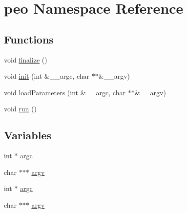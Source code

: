 \hypertarget{namespacepeo}{
\section{peo Namespace Reference}
\label{namespacepeo}
}


\subsection*{Functions}
\begin{CompactItemize}
\item 
\hypertarget{namespacepeo_f90478489cc92d1e6abb222179163a30}{
void \hyperlink{namespacepeo_f90478489cc92d1e6abb222179163a30}{finalize} ()}
\label{namespacepeo_f90478489cc92d1e6abb222179163a30}

\item 
\hypertarget{namespacepeo_8184c3b1f7eecc68f69bb8e8b872a7d3}{
void \hyperlink{namespacepeo_8184c3b1f7eecc68f69bb8e8b872a7d3}{init} (int \&\_\-\_\-argc, char $\ast$$\ast$\&\_\-\_\-argv)}
\label{namespacepeo_8184c3b1f7eecc68f69bb8e8b872a7d3}

\item 
\hypertarget{namespacepeo_2b496ee9b81d9ae322ae6edb9a93dc71}{
void \hyperlink{namespacepeo_2b496ee9b81d9ae322ae6edb9a93dc71}{load\-Parameters} (int \&\_\-\_\-argc, char $\ast$$\ast$\&\_\-\_\-argv)}
\label{namespacepeo_2b496ee9b81d9ae322ae6edb9a93dc71}

\item 
\hypertarget{namespacepeo_10819b2d60b37477c6a89b60c595c67c}{
void \hyperlink{namespacepeo_10819b2d60b37477c6a89b60c595c67c}{run} ()}
\label{namespacepeo_10819b2d60b37477c6a89b60c595c67c}

\end{CompactItemize}
\subsection*{Variables}
\begin{CompactItemize}
\item 
\hypertarget{namespacepeo_18a3998ce8b39c4e1143914fdd07b3d2}{
int $\ast$ \hyperlink{namespacepeo_18a3998ce8b39c4e1143914fdd07b3d2}{argc}}
\label{namespacepeo_18a3998ce8b39c4e1143914fdd07b3d2}

\item 
\hypertarget{namespacepeo_d07043237d4d923125e38860ba9bbe20}{
char $\ast$$\ast$$\ast$ \hyperlink{namespacepeo_d07043237d4d923125e38860ba9bbe20}{argv}}
\label{namespacepeo_d07043237d4d923125e38860ba9bbe20}

\item 
\hypertarget{namespacepeo_18a3998ce8b39c4e1143914fdd07b3d2}{
int $\ast$ \hyperlink{namespacepeo_18a3998ce8b39c4e1143914fdd07b3d2}{argc}}
\label{namespacepeo_18a3998ce8b39c4e1143914fdd07b3d2}

\item 
\hypertarget{namespacepeo_d07043237d4d923125e38860ba9bbe20}{
char $\ast$$\ast$$\ast$ \hyperlink{namespacepeo_d07043237d4d923125e38860ba9bbe20}{argv}}
\label{namespacepeo_d07043237d4d923125e38860ba9bbe20}

\end{CompactItemize}
